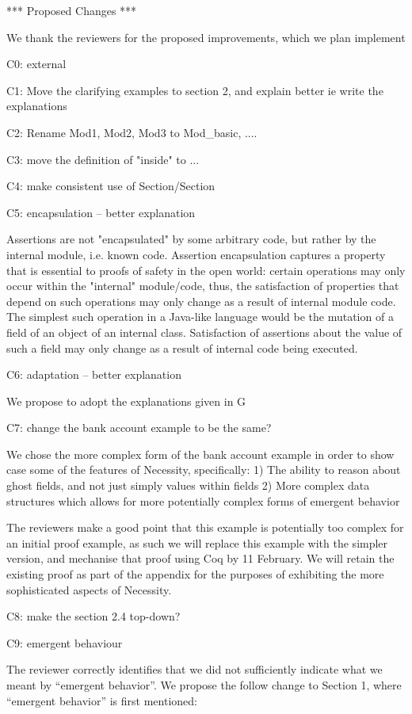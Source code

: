  

*** Proposed Changes ***

We thank the reviewers for the proposed improvements, which we plan implement

C0: external

C1: Move the clarifying examples to section 2, and explain better
ie write the explanations

C2: Rename Mod1, Mod2, Mod3 to Mod_{basic}, ....

C3: move the definition of "inside" to ...

C4: make consistent use of Section/Section

C5: encapsulation -- better explanation

Assertions are not "encapsulated" by some arbitrary code, but rather by the internal module, i.e. known code. Assertion encapsulation captures a property that is essential to proofs of safety in the open world: certain operations may only occur within the "internal" module/code, thus, the satisfaction of properties that depend on such operations may only change as a result of internal module code. The simplest such operation in a Java-like language would be the mutation of a field of an object of an internal class. Satisfaction of assertions about the value of such a field may only change as a result of internal code being executed.
 
C6: adaptation -- better explanation

We propose to adopt the explanations given in G

C7: change the bank account example to be the same?
 
 We chose the more complex form of the bank account example in order to show case some of the features of Necessity, specifically:
1) The ability to reason about ghost fields, and not just simply values within fields
2) More complex data structures which allows for more potentially complex forms of emergent behavior

The reviewers make a good point that this example is potentially too complex for an initial proof example, as such we will 
replace this example with the simpler version, and mechanise that proof using Coq by 11 February. We will retain the existing proof as part 
of the appendix for the purposes of exhibiting the more sophisticated aspects of Necessity.
 
C8: make the section 2.4 top-down?

C9: emergent behaviour 

 The reviewer correctly identifies that we did not sufficiently indicate what we meant by ``emergent behavior''. We propose the follow change 
to Section 1, where ``emergent behavior'' is first mentioned:

